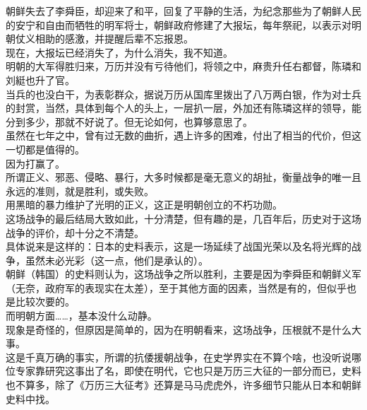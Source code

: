 \begin{multicols}{\theparacolNo}
朝鲜失去了李舜臣，却迎来了和平，回复了平静的生活，为纪念那些为了朝鲜人民的安宁和自由而牺牲的明军将士，朝鲜政府修建了大报坛，每年祭祀，以表示对明朝仗义相助的感激，并提醒后辈不忘报恩。\\

现在，大报坛已经消失了，为什么消失，我不知道。\\

明朝的大军得胜归来，万历并没有亏待他们，将领之中，麻贵升任右都督，陈璘和刘綎也升了官。\\

当兵的也没白干，为表彰群众，据说万历从国库里拨出了八万两白银，作为对士兵的封赏，当然，具体到每个人的头上，一层扒一层，外加还有陈璘这样的领导，能分到多少，那就不好说了。但无论如何，也算够意思了。\\

虽然在七年之中，曾有过无数的曲折，遇上许多的困难，付出了相当的代价，但这一切都是值得的。\\

因为打赢了。\\

所谓正义、邪恶、侵略、暴行，大多时候都是毫无意义的胡扯，衡量战争的唯一且永远的准则，就是胜利，或失败。\\

用黑暗的暴力维护了光明的正义，这正是明朝创立的不朽功勋。\\

这场战争的最后结局大致如此，十分清楚，但有趣的是，几百年后，历史对于这场战争的评价，却十分之不清楚。\\

具体说来是这样的：日本的史料表示，这是一场延续了战国光荣以及名将光辉的战争，虽然未必光彩（这一点，他们是承认的）。\\

朝鲜（韩国）的史料则认为，这场战争之所以胜利，主要是因为李舜臣和朝鲜义军（无奈，政府军的表现实在太差），至于其他方面的因素，当然是有的，但似乎也是比较次要的。\\

而明朝方面……，基本没什么动静。\\

现象是奇怪的，但原因是简单的，因为在明朝看来，这场战争，压根就不是什么大事。\\

这是千真万确的事实，所谓的抗倭援朝战争，在史学界实在不算个啥，也没听说哪位专家靠研究这事出了名，即使在明代，它也只是万历三大征的一部分而已，史料也不算多，除了《万历三大征考》还算是马马虎虎外，许多细节只能从日本和朝鲜史料中找。\\


\end{multicols}
